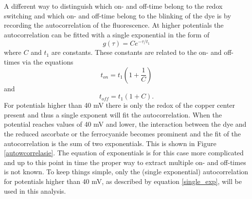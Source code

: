 \documentclass[twoside,single]{lion-msc}
\begin{document}
A different way to distinguish which on- and off-time belong to the redox switching and which on- and off-time belong to the blinking of the dye is by recording the autocorrelation of the fluorescence. At higher potentials the autocorrelation can be fitted with a single exponential in the form of
\begin{equation} \label{single_exp}
g(\tau) =  Ce^{-\tau/t_{1}}
\end{equation}
where $C$ and $t_{1}$ are constants. These constants are related to the on- and off-times via the equations
\begin{equation}\label{tau_on}
t_{on} = t_{1}\left ( 1 + \frac{1}{C} \right )
\end{equation}
and
\begin{equation}\label{tau_off}
t_{off} = t_{1}(1 + C).
\end{equation}
For potentials higher than 40 mV there is only the redox of the copper center present and thus a single exponent will fit the autocorrelation. When the potential reaches values of 40 mV and lower, the interaction between the dye and the reduced ascorbate or the ferrocyanide becomes prominent and the fit of the autocorrelation is the sum of two exponentials. This is shown in Figure \ref{autowcorrelasie}. The equation of exponentials is for this case more complicated and up to this point in time the proper way to extract multiple on- and off-times is not known. To keep things simple, only the (single exponential) autocorrelation for potentials higher than 40 mV, as described by equation \ref{single_exp}, will be used in this analysis.  

\newpage
\end{document}
